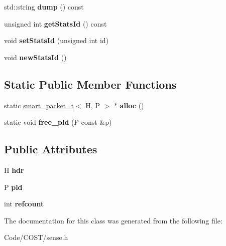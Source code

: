 \begin{DoxyCompactItemize}
std\+::string {\bfseries dump} () const
\item 
\mbox{\label{classsmart__packet__t_a43ced9e12d6917ccfb206e703ea81081}} 
unsigned int {\bfseries get\+Stats\+Id} () const
\item 
\mbox{\label{classsmart__packet__t_a07c7003097c029dcb9969edb52eaeaa6}} 
void {\bfseries set\+Stats\+Id} (unsigned int id)
\item 
\mbox{\label{classsmart__packet__t_a3856b74c71d0aee7d49d01280f5e8162}} 
void {\bfseries new\+Stats\+Id} ()
\end{DoxyCompactItemize}
\subsection*{Static Public Member Functions}
\begin{DoxyCompactItemize}
\item 
\mbox{\label{classsmart__packet__t_adb0b247b36ecb7fc9317ffde91fedd5c}} 
static \hyperlink{classsmart__packet__t}{smart\+\_\+packet\+\_\+t}$<$ H, P $>$ $\ast$ {\bfseries alloc} ()
\item 
\mbox{\label{classsmart__packet__t_ae4348be554c56f0aaba16caf80b9ed13}} 
static void {\bfseries free\+\_\+pld} (P const \&p)
\end{DoxyCompactItemize}
\subsection*{Public Attributes}
\begin{DoxyCompactItemize}
\item 
\mbox{\label{classsmart__packet__t_aeed0543f90cc59208a71248273f0ab05}} 
H {\bfseries hdr}
\item 
\mbox{\label{classsmart__packet__t_ad4f8c9b565ab72d1c92f52f60f1693cc}} 
P {\bfseries pld}
\item 
\mbox{\label{classsmart__packet__t_ac8fb5c39955a25560ec04c8b0e3c70fd}} 
int {\bfseries refcount}
\end{DoxyCompactItemize}


The documentation for this class was generated from the following file\+:\begin{DoxyCompactItemize}
\item 
Code/\+C\+O\+S\+T/sense.\+h\end{DoxyCompactItemize}
